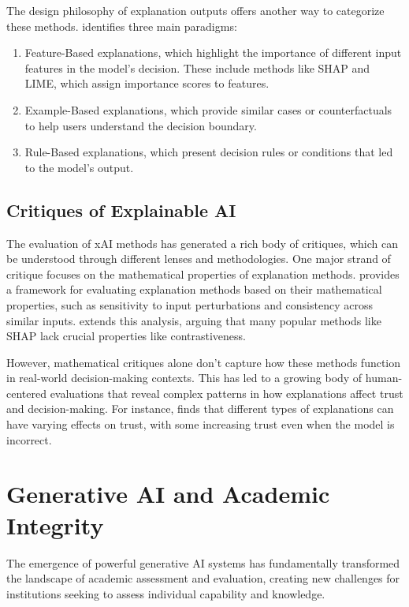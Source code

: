 The design philosophy of explanation outputs offers another way to categorize these methods. \textcite{friedrich_taxonomy_2011} identifies three main paradigms:

\begin{enumerate}
    \item Feature-Based explanations, which highlight the importance of different input features in the model's decision. These include methods like SHAP and LIME, which assign importance scores to features.
    \item Example-Based explanations, which provide similar cases or counterfactuals to help users understand the decision boundary.
    \item Rule-Based explanations, which present decision rules or conditions that led to the model's output.
\end{enumerate}

\subsection{Critiques of Explainable AI}\label{ssec:xai_critiques}
The evaluation of xAI methods has generated a rich body of critiques, which can be understood through different lenses and methodologies. One major strand of critique focuses on the mathematical properties of explanation methods. \textcite{doshi-velez_towards_2017} provides a framework for evaluating explanation methods based on their mathematical properties, such as sensitivity to input perturbations and consistency across similar inputs. \textcite{kumar_problems_2020} extends this analysis, arguing that many popular methods like SHAP lack crucial properties like contrastiveness.

However, mathematical critiques alone don't capture how these methods function in real-world decision-making contexts. This has led to a growing body of human-centered evaluations that reveal complex patterns in how explanations affect trust and decision-making. For instance, \textcite{lai_human_2019} finds that different types of explanations can have varying effects on trust, with some increasing trust even when the model is incorrect.

\section{Generative AI and Academic Integrity}\label{sec:genai_background}

The emergence of powerful generative AI systems has fundamentally transformed the landscape of academic assessment and evaluation, creating new challenges for institutions seeking to assess individual capability and knowledge.

